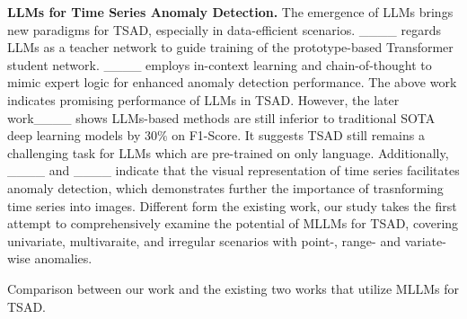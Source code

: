 \textbf{LLMs for Time Series Anomaly Detection.}
The emergence of LLMs brings new paradigms for TSAD, especially in data-efficient scenarios. ____ regards LLMs as a teacher network to guide training of the prototype-based Transformer student network. ____ employs in-context learning and chain-of-thought to mimic expert logic for enhanced anomaly detection performance. The above work indicates promising performance of LLMs in TSAD. However, the later work____ shows LLMs-based methods are still inferior to traditional SOTA deep learning models by $30\%$ on F1-Score. It suggests TSAD still remains a challenging task for LLMs which are pre-trained on only language. Additionally, ____ and ____ indicate that the visual representation of time series facilitates anomaly detection, which demonstrates further the importance of trasnforming time series into images. Different form the existing work, our study takes the first attempt to comprehensively examine the potential of MLLMs for TSAD, covering univariate, multivaraite, and irregular scenarios with point-, range- and variate-wise anomalies.  
\begin{table}[!t]
\renewcommand{\arraystretch}{1.2}%
    \centering
    \setlength{\tabcolsep}{4pt}
\caption{Comparison between our work and the existing two works that utilize MLLMs for TSAD.}
\label{tab:related}
\vspace{-0.7cm}
\end{table}
